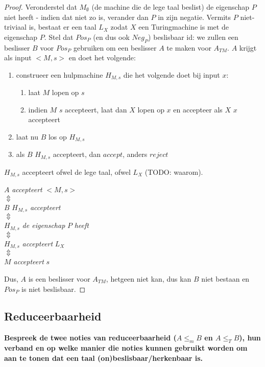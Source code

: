 \documentclass[
10pt,
a4paper,
oneside,
headinclude,footinclude, 
BCOR5mm,
]{scrartcl}
\begin{document}
\begin{proof}
	Veronderstel dat $M_\emptyset$ (de machine die de lege taal beslist) de eigenschap $P$ niet heeft - indien dat niet zo is, verander dan $P$ in zijn negatie. Vermits $P$ niet-triviaal is, bestaat er een taal $L_X$ zodat $X$ een Turingmachine is met de eigenschap $P$. Stel dat $Pos_P$ (en dus ook $Neg_P$) beslisbaar id: we zullen een beslisser $B$ voor $Pos_P$ gebruiken om een beslisser $A$ te maken voor $A_{TM}$. $A$ krijgt als input $<M,s>$ en doet het volgende:
	\begin{enumerate}
		\item construeer een hulpmachine $H_{M,s}$ die het volgende doet bij input $x$:
		\begin{enumerate}
			\item laat $M$ lopen op $s$
			\item indien $M$ $s$ accepteert, laat dan $X$ lopen op $x$ en accepteer als $X$ $x$ accepteert
		\end{enumerate}
		\item laat nu $B$ los op $H_{M,s}$
		\item als $B$ $H_{M,s}$ accepteert, dan $accept$, anders $reject$
	\end{enumerate}
	$H_{M,s}$ accepteert ofwel de lege taal, ofwel $L_X$ (TODO: waarom).\\
	\begin{center}
		$A$ \textit{accepteert} $<M,s>$ \\
		$\Updownarrow$ \\
		$B$ $H_{M,s}$ \textit{accepteert} \\
		$\Updownarrow$ \\
		$H_{M,s}$ \textit{de eigenschap} $P$ \textit{heeft} \\
		$\Updownarrow$ \\
		$H_{M,s}$ \textit{accepteert} $L_X$ \\
		$\Updownarrow$ \\
		$M$ \textit{accepteert} $s$
	\end{center}
	Dus, $A$ is een beslisser voor $A_{TM}$, hetgeen niet kan, dus kan $B$ niet bestaan en $Pos_P$ is niet beslisbaar.
\end{proof}

\newpage
\subsection{Reduceerbaarheid}

\textbf{Bespreek de twee noties van reduceerbaarheid ($A \leq_m B$ en $A \leq_T B$), hun verband en op welke manier die noties kunnen gebruikt worden om aan te tonen dat een taal (on)beslisbaar/herkenbaar is.}
\end{document}
